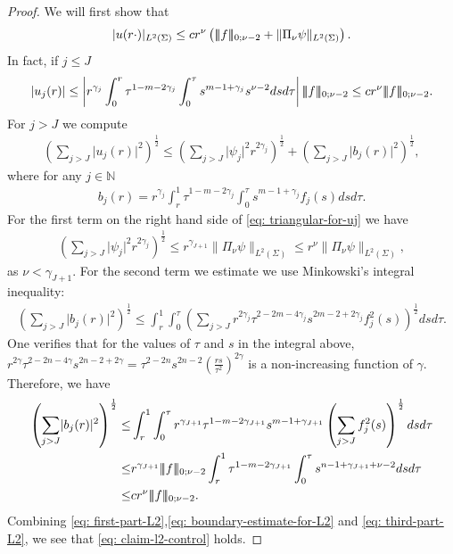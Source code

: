 \documentclass[11pt]{amsart}
\DeclarePairedDelimiter{\tnorm}{\vert\!\vert\!\vert}{\vert\!\vert\!\vert}
\theoremstyle{definition}
\theoremstyle{remark}
\begin{document}
\begin{proof}
    We will first show that
    \begin{align}\label{eq: claim-l2-control}
        \lvert u(r\cdot)\rvert_{L^2(\Sigma)}\leq cr^\nu \left(\tnorm{f}_{0;\nu-2}+\lVert\Pi_\nu\psi\rVert_{L^2(\Sigma)}\right).
    \end{align}
    In fact, if $j\leq J$
    \begin{align}\label{eq: first-part-L2}
        \lvert u_j(r)\rvert\leq \left\lvert r^{\gamma_j}\int_0^r\tau^{1-m-2\gamma_j}\int_0^\tau s^{m-1+\gamma_j}s^{\nu-2}ds d\tau\right\rvert\tnorm{f}_{0;\nu-2}\leq c r^\nu\tnorm{f}_{0;\nu-2}. 
    \end{align}
    For $j> J$ we compute
    \begin{align}\label{eq: triangular-for-uj}
        \left(\sum_{j>J}\lvert u_j(r)\rvert^2\right)^\frac{1}{2}\leq \left(\sum_{j>J}\lvert \psi_j\rvert^2r^{2\gamma_j}\right)^\frac{1}{2}+\left(\sum_{j>J}\lvert b_j(r)\rvert^2\right)^\frac{1}{2},
    \end{align}
    where for any $j\in \mathbb{N}$
    \begin{align*}
        b_j(r)=r^{\gamma_j}\int_r^1\tau^{1-m-2\gamma_j}\int_0^\tau s^{m-1+\gamma_j}f_j(s)dsd\tau.
    \end{align*}
    For the first term on the right hand side of \eqref{eq: triangular-for-uj} we have
    \begin{align}\label{eq: boundary-estimate-for-L2}
    \left(\sum_{j>J}\lvert \psi_j\rvert^2r^{2\gamma_j}\right)^\frac{1}{2}\leq r^{\gamma_{J+1}}\lVert \Pi_\nu\psi\rVert_{L^2(\Sigma)}\leq r^\nu\lVert \Pi_\nu\psi\rVert_{L^2(\Sigma)},
    \end{align}
    as $\nu<\gamma_{J+1}$.
    For the second term we estimate we use Minkowski's integral inequality:
    \begin{align*}
        \left(\sum_{j>J}\lvert b_j(r)\rvert^2\right)^\frac{1}{2}\leq \int_r^1\int_0^\tau\left(\sum_{j>J}r^{2\gamma_j}\tau^{2-2m-4\gamma_j}s^{2m-2+2\gamma_j}f_j^2(s)\right)^\frac{1}{2}dsd\tau.
    \end{align*}
One verifies that for the values of $\tau$ and $s$ in the integral above, $r^{2\gamma}\tau^{2-2n-4\gamma}s^{2n-2+2\gamma}=\tau^{2-2n}s^{2n-2}\left(\frac{rs}{\tau^2}\right)^{2\gamma}$ is a non-increasing function of $\gamma$. Therefore, we have
\begin{align}\label{eq: third-part-L2}
        \left(\sum_{j>J}\lvert b_j(r)\rvert^2\right)^\frac{1}{2}\leq& \int_r^1\int_0^\tau r^{\gamma_{J+1}}\tau^{1-m-2\gamma_{J+1}}s^{m-1+\gamma_{J+1}} \left(\sum_{j>J}f_j^2(s)\right)^\frac{1}{2}dsd\tau\\
        \nonumber 
    \leq&r^{\gamma_{J+1}}\tnorm{f}_{0;\nu-2}\int_r^1\tau^{1-m-2\gamma_{J+1}}\int_0^\tau s^{n-1+\gamma_{J+1}+\nu-2}dsd\tau\\
    \nonumber
        \leq&c r^\nu\tnorm{f}_{0;\nu-2}.
    \end{align}
Combining \eqref{eq: first-part-L2},\eqref{eq: boundary-estimate-for-L2} and \eqref{eq: third-part-L2}, we see that \eqref{eq: claim-l2-control} holds.  


\end{proof}
\end{document}
